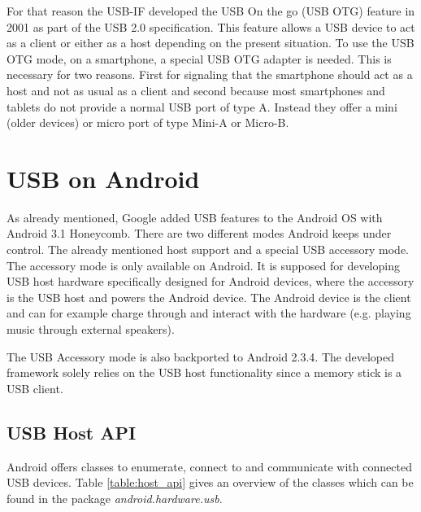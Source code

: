 For that reason the USB-IF developed the USB On the go (USB OTG) feature in 2001 as part of the USB 2.0 specification\cite{wiki_usb}. This feature allows a USB device to act as a client or either as a host depending on the present situation. To use the USB OTG mode, on a smartphone, a special USB OTG adapter is needed. This is necessary for two reasons. First for signaling that the smartphone should act as a host and not as usual as a client and second because most smartphones and tablets do not provide a normal USB port of type A. Instead they offer a mini (older devices) or micro port of type Mini-A or Micro-B\cite{wiki_usb_otg}. 

\chapter{USB on Android}
\label{chapter:usb_on_android}

As already mentioned, Google added USB features to the Android OS with Android 3.1 Honeycomb. There are two different modes Android keeps under control. The already mentioned host support and a special USB accessory mode. The accessory mode is only available on Android. It is supposed for developing USB host hardware specifically designed for Android devices, where the accessory is the USB host and powers the Android device\cite{android_usb_accessory}. The Android device is the client and can for example charge through and interact with the hardware (e.g. playing music through external speakers). 

The USB Accessory mode is also backported to Android 2.3.4\cite{android_usb_accessory}. The developed framework solely relies on the USB host functionality since a memory stick is a USB client.

\section{USB Host API}

Android offers classes to enumerate, connect to and communicate with connected USB devices. Table \ref{table:host_api} gives an overview of the classes which can be found in the package \textit{android.hardware.usb}.

